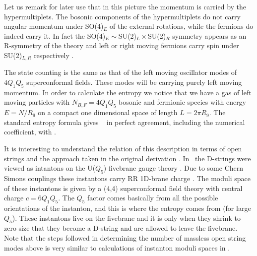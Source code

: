 Let us remark for later use that in this picture the momentum 
is carried by the hypermultiplets. The bosonic components
of the hypermultiplets do not carry angular momentum under SO(4)$_E$
of the
external rotations, while the fermions do indeed carry it. 
In fact the SO(4)$_E \sim $SU(2)$_L \times $SU(2)$_R$ symmetry
appears as an R-symmetry of the theory and  left or
right moving fermions carry spin under SU(2)$_{L,R}$ respectively \spn .

The state 
counting is the same as that of the left moving oscillator modes
of $ 4 Q_1 Q_5 $   superconformal fields.
These modes will be carrying purely left moving momentum. 
In order to calculate the entropy we notice that we
have a gas of left moving particles  with
$ N_{B,F} = 4 Q_1 Q_5 $
 bosonic and fermionic species with  energy 
$E=N/R_9$
on a compact one dimensional space of length $L= 2 \pi R_9 $.
The standard entropy formula gives \sv \cama\
\eqn{}
in perfect agreement, including the numerical coefficient, 
 with \entropyext .


It is interesting to understand the relation of this
description in terms of open strings and the 
approach taken in the original derivation \sv .
In \sv\ the D-strings were viewed as intantons on
the U($Q_5$) fivebrane gauge theory \dgl \vafacount .
 Due to some
Chern Simons couplings these instantons carry RR
1D-brane charge \dgl . The moduli space of these instantons
is given by a (4,4) superconformal field theory with 
central charge $c = 6 Q_1 Q_5$. The $Q_5$ factor comes 
basically from all the possible orientations
of the instanton, and this is where the 
entropy comes from (for large $Q_5$). These instantons
live on the fivebrane and it is only when they 
shrink to zero size that they become a D-string and
are allowed to leave the fivebrane. 
Note that the steps followed in determining the number
of massless open string modes above is very similar
to calculations of instanton moduli spaces 
in \wittensmall . 

